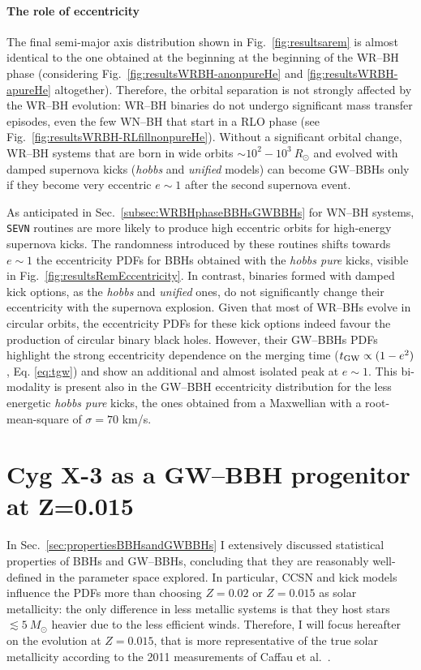 \documentclass[a4paper,titlepage]{book}     	%
\newcommand{\sun}{\ensuremath{_\odot}}
\newcommand{\msun}{\ensuremath{M\sun}}
\newcommand{\rsun}{R_{\odot}}
\begin{document}
\paragraph{The role of eccentricity} The final semi-major axis distribution shown in Fig.\ \ref{fig:resultsarem} is almost identical to the one obtained at the beginning at the beginning of the WR--BH phase (considering Fig.\ \ref{fig:resultsWRBH-anonpureHe} and \ref{fig:resultsWRBH-apureHe} altogether). Therefore, the orbital separation is not strongly affected by the WR--BH evolution: WR--BH binaries do not undergo significant mass transfer episodes, even the few WN--BH that start in a RLO phase (see Fig.\ \ref{fig:resultsWRBH-RLfillnonpureHe}). Without a significant orbital change, WR--BH systems that are born in wide orbits $\sim 10^2 - 10^3~\rsun$ and evolved with damped supernova kicks (\emph{hobbs} and \emph{unified} models) can become GW--BBHs only if they become very eccentric $e \sim 1$ after the second supernova event. 

As anticipated in Sec.\ \ref{subsec:WRBHphaseBBHsGWBBHs} for WN--BH systems, \texttt{SEVN} routines are more likely to produce high eccentric orbits for high-energy supernova kicks. The randomness introduced by these routines shifts towards $e \sim 1$ the eccentricity PDFs for BBHs obtained with the \emph{hobbs pure} kicks, visible in Fig.\ \ref{fig:resultsRemEccentricity}. In contrast, binaries formed with damped kick options, as the \emph{hobbs} and \emph{unified} ones, do not significantly change their eccentricity with the supernova explosion. Given that most of WR--BHs evolve in circular orbits, the eccentricity PDFs for these kick options indeed favour the production of circular binary black holes. However, their GW--BBHs PDFs highlight the strong eccentricity dependence on the merging time ($t_{\rm GW} \propto (1-e^2)$, Eq. \ref{eq:tgw}) and show an additional and almost isolated peak at $e \sim 1$. This bi-modality is present also in the GW--BBH eccentricity distribution for the less energetic \emph{hobbs pure} kicks, the ones obtained from a Maxwellian with a root-mean-square of $\sigma = 70$ km/s.





\section{Cyg X-3 as a GW--BBH progenitor at Z=0.015}\label{sec:CygX3vsGWBBHsproperties}
In Sec.\ \ref{sec:propertiesBBHsandGWBBHs} I extensively discussed statistical properties of BBHs and GW--BBHs, concluding that they are reasonably well-defined in the parameter space explored. In particular, CCSN and kick models influence the PDFs more than choosing $Z=0.02$ or $Z=0.015$ as solar metallicity: the only difference in less metallic systems is that they host stars $\lesssim 5~\msun$ heavier due to the less efficient winds. Therefore, I will focus hereafter on the evolution at $Z=0.015$, that is more representative of the true solar metallicity according to the 2011 measurements of Caffau et al.\ \cite{caffau2011solarmetallicity}.
\end{document}
